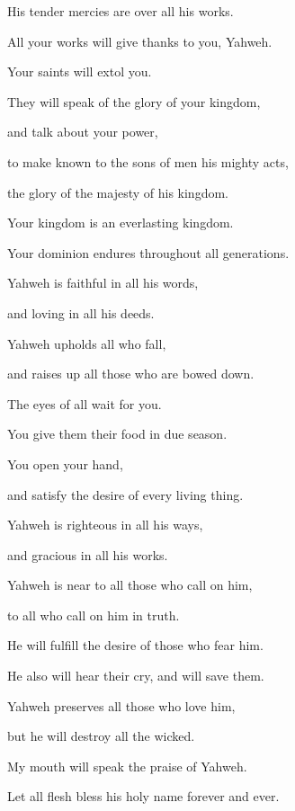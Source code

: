{\par }{\QB His tender mercies are over all his works.
\par }{\Q {}All your works will give thanks to you, Yahweh.
\par }{\QB Your saints will extol you.
\par }{\Q {}They will speak of the glory of your kingdom,
\par }{\QB and talk about your power,
\par }{\Q {}to make known to the sons of men his mighty acts,
\par }{\QB the glory of the majesty of his kingdom.
\par }{\Q {}Your kingdom is an everlasting kingdom.
\par }{\QB Your dominion endures throughout all generations.
\par }{\Q Yahweh is faithful in all his words,
\par }{\QB and loving in all his deeds.
\par }{\Q {}Yahweh upholds all who fall,
\par }{\QB and raises up all those who are bowed down.
\par }{\Q {}The eyes of all wait for you.
\par }{\QB You give them their food in due season.
\par }{\Q {}You open your hand,
\par }{\QB and satisfy the desire of every living thing.
\par }{\Q {}Yahweh is righteous in all his ways,
\par }{\QB and gracious in all his works.
\par }{\Q {}Yahweh is near to all those who call on him,
\par }{\QB to all who call on him in truth.
\par }{\Q {}He will fulfill the desire of those who fear him.
\par }{\QB He also will hear their cry, and will save them.
\par }{\Q {}Yahweh preserves all those who love him,
\par }{\QB but he will destroy all the wicked.
\par }{\Q {}My mouth will speak the praise of Yahweh.
\par }{\QB Let all flesh bless his holy name forever and ever.
\par }{\BB \par }
